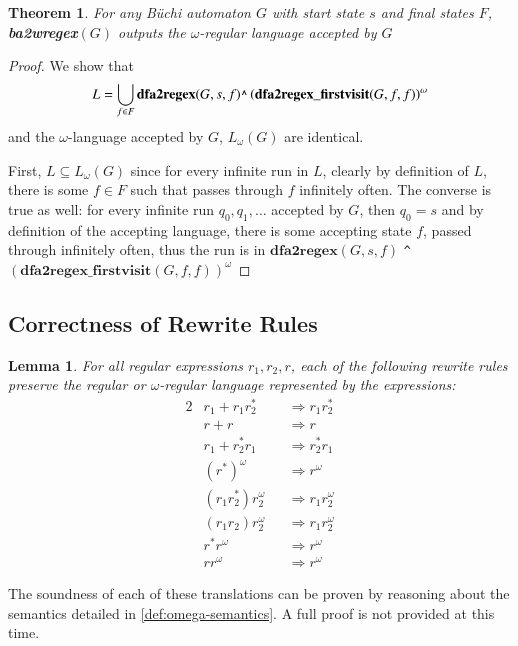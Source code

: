 \documentclass[preprint,12pt]{elsarticle}
\newtheorem{theorem}{Theorem}[section]
\newtheorem{lemma}{Lemma}[section]
\theoremstyle{definition}
\theoremstyle{remark}
\newcommand{\Buchi}{B\"{u}chi }
\begin{document}
\begin{theorem}
    For any \Buchi automaton $G$ with start state $s$ and final states $F$, \textbf{ba2wregex}$(G)$ outputs the $\omega$-regular language accepted by $G$
\end{theorem}
\begin{proof}
    We show that
    \[
        L = \bigcup_{f\in F} \textbf{dfa2regex}(G, s, f) \verb|^| \left(\textbf{dfa2regex\_firstvisit}(G, f, f)\right)^\omega
    \]
    and the $\omega$-language accepted by $G$, $L_\omega(G)$ are identical.

    First, $L\subseteq L_\omega(G)$ since for every infinite run in $L$, clearly by definition of $L$, there is some $f\in F$ such that passes through $f$ infinitely often. The converse is true as well: for every infinite run $q_0, q_1, \dots$ accepted by $G$, then $q_0 = s$ and by definition of the accepting language, there is some accepting state $f$, passed through infinitely often, thus the run is in $\textbf{dfa2regex}(G, s, f)$ \verb|^| $\left(\textbf{dfa2regex\_firstvisit}(G, f, f)\right)^\omega$
\end{proof}
\subsection{Correctness of Rewrite Rules}
\begin{lemma}
    For all regular expressions $r_1, r_2, r$, each of the following rewrite rules preserve the regular or $\omega$-regular language represented by the expressions:
    \begin{alignat}{2}
        & r_1 + r_1r_2^* && \Longrightarrow r_1r_2^* \\
        & r + r && \Longrightarrow r \\
        & r_1 + r_2^*r_1 && \Longrightarrow r_2^*r_1 \\
        & (r^*)^{\omega} && \Longrightarrow r^{\omega} \\
        & (r_1r_2^*)r_2^{\omega} && \Longrightarrow r_1r_2^{\omega} \\
        & (r_1r_2)r_2^{\omega} && \Longrightarrow r_1r_2^{\omega} \\
        & r^*r^{\omega} && \Longrightarrow r^{\omega} \\
        & rr^{\omega} && \Longrightarrow r^{\omega}
    \end{alignat}
\end{lemma}

The soundness of each of these translations can be proven by reasoning about the  semantics detailed in \cref{def:omega-semantics}. A full proof is not provided at this time.
\end{document}
